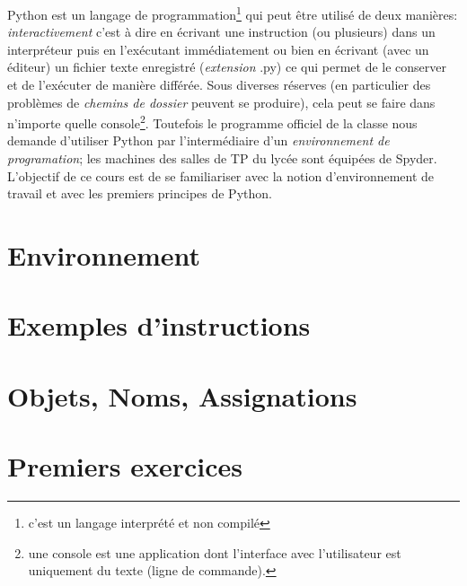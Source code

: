 

\usepackage{parcolumns}
\setlength{\parindent}{0pt}

 
Python est un langage de programmation\footnote{c'est un langage interprété et non compilé} qui peut être utilisé de deux manières: 
\emph{interactivement} c'est à dire en écrivant une instruction (ou plusieurs) dans un interpréteur puis en l'exécutant immédiatement ou bien en écrivant (avec un éditeur) un fichier texte enregistré (\emph{extension} .py) ce qui permet de le conserver et de l'exécuter de manière différée.\newline
Sous diverses réserves (en particulier des problèmes de \emph{chemins de dossier} peuvent se produire), cela peut se faire dans n'importe quelle console\footnote{une console est une application dont l'interface avec l'utilisateur est uniquement du texte (ligne de commande).}. Toutefois le programme officiel de la classe nous demande d'utiliser Python par l'intermédiaire d'un \emph{environnement de programation}; les machines des salles de TP du lycée sont équipées de Spyder.\newline
L'objectif de ce cours est de se familiariser avec la notion d'environnement de travail et avec les premiers principes de Python.

\section{Environnement}


\section{Exemples d'instructions}


\section{Objets, Noms, Assignations}


\section{Premiers exercices}

